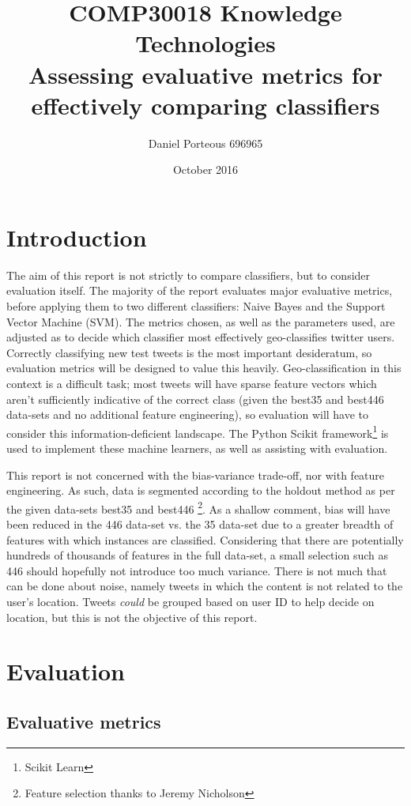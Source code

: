 \documentclass[twocolumn]{article}
\title{COMP30018 Knowledge Technologies \\ \large Assessing evaluative metrics for effectively comparing classifiers}
\author{Daniel Porteous 696965}
\date{October 2016}
\begin{document}
\maketitle

\section{Introduction}
The aim of this report is not strictly to compare classifiers, but to consider evaluation itself. The majority of the report evaluates major evaluative metrics, before applying them to two different classifiers: Naive Bayes and the Support Vector Machine (SVM). The metrics chosen, as well as the parameters used, are adjusted as to decide which classifier most effectively geo-classifies twitter users. Correctly classifying new test tweets is the most important desideratum, so evaluation metrics will be designed to value this heavily. Geo-classification in this context is a difficult task; most tweets will have sparse feature vectors which aren't sufficiently indicative of the correct class (given the best35 and best446 data-sets and no additional feature engineering), so evaluation will have to consider this information-deficient landscape. The Python Scikit framework\footnote{\cite{scikit-learn} Scikit Learn} is used to implement these machine learners, as well as assisting with evaluation.
\par\vspace{4mm}
This report is not concerned with the bias-variance trade-off, nor with feature engineering. As such, data is segmented according to the holdout method as per the given data-sets best35 and best446 \footnote{Feature selection thanks to Jeremy Nicholson}. As a shallow comment, bias will have been reduced in the 446 data-set vs. the 35 data-set due to a greater breadth of features with which instances are classified. Considering that there are potentially hundreds of thousands of features in the full data-set, a small selection such as 446 should hopefully not introduce too much variance. There is not much that can be done about noise, namely tweets in which the content is not related to the user's location. Tweets \textit{could} be grouped based on user ID to help decide on location, but this is not the objective of this report.

\section{Evaluation}
\subsection{Evaluative metrics}
\end{document}
